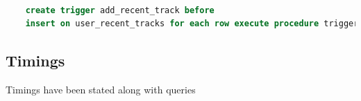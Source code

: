 \documentclass[10pt]{article}
\begin{document}
\begin{itemize}
\begin{itemize}
\begin{lstlisting}[language=SQL,
                deletekeywords={IDENTITY,INT},
                morekeywords={clustered},    
                framesep=10pt,
                framextopmargin=10pt]
    
    create trigger add_recent_track before
    insert on user_recent_tracks for each row execute procedure trigger_add_recent_track();

            \end{lstlisting}
     \end{itemize}
     
\end{itemize}

\subsection{Timings}

Timings have been stated along with queries
\end{document}
